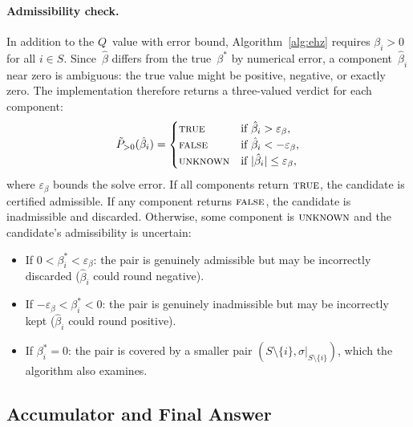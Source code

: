 
\paragraph{Admissibility check.}
In addition to the $Q$~value with error bound,
Algorithm~\ref{alg:ehz} requires
$\beta_i > 0$ for all $i \in S$.
Since~$\hat\beta$ differs from the true~$\beta^*$ by
numerical error, a component~$\hat\beta_i$ near zero is
ambiguous: the true value might be positive, negative,
or exactly zero.
The implementation therefore returns a three-valued verdict
for each component:
\[
  \tilde P_{>0}(\hat\beta_i) =
  \begin{cases}
    \textsc{true}
      & \text{if } \hat\beta_i > \varepsilon_\beta, \\
    \textsc{false}
      & \text{if } \hat\beta_i < -\varepsilon_\beta, \\
    \textsc{unknown}
      & \text{if } |\hat\beta_i| \leq \varepsilon_\beta,
  \end{cases}
\]
where $\varepsilon_\beta$ bounds the solve error.
If all components return $\textsc{true}$, the candidate
is certified admissible.
If any component returns $\textsc{false}$, the candidate
is inadmissible and discarded.
Otherwise, some component is $\textsc{unknown}$ and
the candidate's admissibility is uncertain:
\begin{itemize}
\item If $0 < \beta^*_i < \varepsilon_\beta$:
  the pair is genuinely admissible but may be incorrectly
  discarded ($\hat\beta_i$ could round negative).
\item If $-\varepsilon_\beta < \beta^*_i < 0$:
  the pair is genuinely inadmissible but may be incorrectly
  kept ($\hat\beta_i$ could round positive).
\item If $\beta^*_i = 0$:
  the pair is covered by a smaller
  pair $(S \setminus \{i\}, \sigma|_{S \setminus \{i\}})$,
  which the algorithm also examines.
\end{itemize}



\subsection{Accumulator and Final Answer}\label{app:answer}

